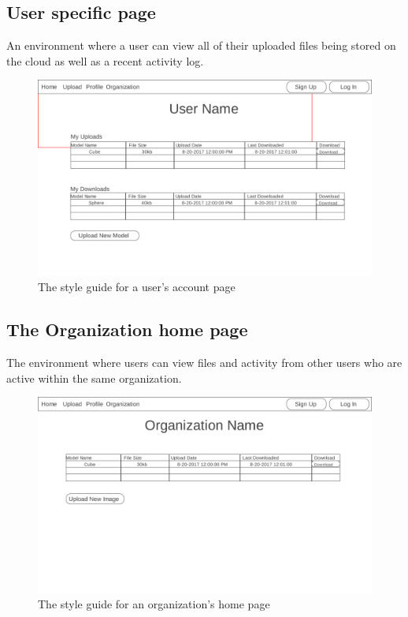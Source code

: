 \newpage
\subsection{User specific page}
    \hspace{7mm}
    An environment where a user can view all of their uploaded files being stored 
    on the cloud as well as a recent activity log.
    \ \\
    \label{fig:proto_web_user_page}
    \begin{figure}[H]
        \centering \includegraphics[width=0.6\linewidth]{UserPage}
        \caption{The style guide for a user's account page}
    \end{figure}

\subsection{The Organization home page}
    \hspace{7mm}
    The environment where users can view files and activity from other users who are
    active within the same organization.
    \ \\
    \label{fig:proto_web_organization_home}
    \begin{figure}[H]
        \centering \includegraphics[width=0.6\linewidth]{Organization}
        \caption{The style guide for an organization's home page}
    \end{figure}

\newpage
